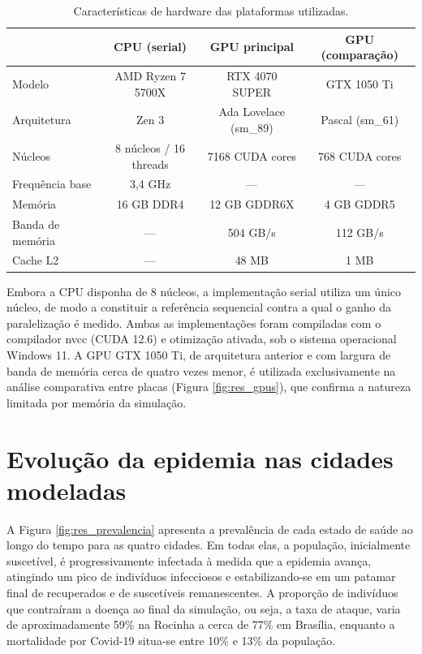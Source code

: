\documentclass[
	12pt,				%
	openright,			%
	oneside,			%
	a4paper,			%
	english,			%
	french,				%
	spanish,			%
	brazil				%
	]{abntex2}
\begin{document}
\begin{table}[H]
\centering
\begin{tabular}{|l|c|c|c|}
\hline
 & \textbf{CPU (serial)} & \textbf{GPU principal} & \textbf{GPU (comparação)} \\
\hline
Modelo & AMD Ryzen 7 5700X & RTX 4070 SUPER & GTX 1050 Ti \\
Arquitetura & Zen 3 & Ada Lovelace (sm\_89) & Pascal (sm\_61) \\
Núcleos & 8 núcleos / 16 threads & 7168 CUDA cores & 768 CUDA cores \\
Frequência base & 3,4 GHz & --- & --- \\
Memória & 16 GB DDR4 & 12 GB GDDR6X & 4 GB GDDR5 \\
Banda de memória & --- & 504 GB/s & 112 GB/s \\
Cache L2 & --- & 48 MB & 1 MB \\
\hline
\end{tabular}
\caption{Características de hardware das plataformas utilizadas.}
\label{tab:hardware}
\end{table}

Embora a CPU disponha de 8 núcleos, a implementação serial utiliza um único núcleo, de modo a constituir a referência sequencial contra a qual o ganho da paralelização é medido. Ambas as implementações foram compiladas com o compilador nvcc (CUDA 12.6) e otimização ativada, sob o sistema operacional Windows 11. A GPU GTX 1050 Ti, de arquitetura anterior e com largura de banda de memória cerca de quatro vezes menor, é utilizada exclusivamente na análise comparativa entre placas (Figura \ref{fig:res_gpus}), que confirma a natureza limitada por memória da simulação.

\section{Evolução da epidemia nas cidades modeladas}

A Figura \ref{fig:res_prevalencia} apresenta a prevalência de cada estado de saúde ao longo do tempo para as quatro cidades. Em todas elas, a população, inicialmente suscetível, é progressivamente infectada à medida que a epidemia avança, atingindo um pico de indivíduos infecciosos e estabilizando-se em um patamar final de recuperados e de suscetíveis remanescentes. A proporção de indivíduos que contraíram a doença ao final da simulação, ou seja, a taxa de ataque, varia de aproximadamente 59\% na Rocinha a cerca de 77\% em Brasília, enquanto a mortalidade por Covid-19 situa-se entre 10\% e 13\% da população.
\end{document}
